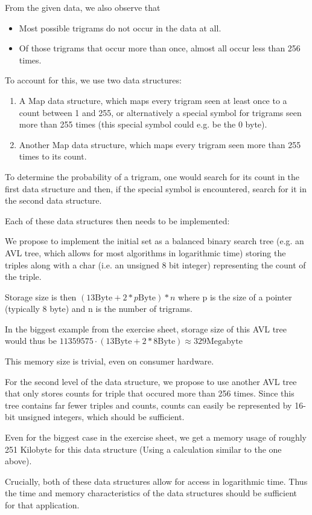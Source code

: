 \documentclass[%
   11pt,              %
   ngerman,           %
   a4paper,           %
   DIV11,             %
]{scrartcl}%
\begin{document}
From the given data, we also observe that 
\begin{itemize}
    \item Most possible trigrams do not occur in the data at all.
    \item Of those trigrams that occur more than once, almost all occur less than 256 times.
\end{itemize}

To account for this, we use two data structures:

\begin{enumerate}
    \item A Map data structure, which maps every trigram seen at least once to a count between 1 and 255, or alternatively a special symbol for trigrams seen more than 255 times (this special symbol could e.g. be the 0 byte).
    \item Another Map data structure, which maps every trigram seen more than 255 times to its count.
\end{enumerate}

To determine the probability of a trigram, one would search for its count in the first data structure and then, if the special symbol is encountered, search for it in the second data structure.

Each of these data structures then needs to be implemented:

We propose to implement the initial set as a balanced binary search tree (e.g. an AVL tree, which allows for most algorithms in logarithmic time) storing the triples along with a char (i.e. an unsigned 8 bit integer) representing the count of the triple. 

Storage size is then $(13 \text{Byte} + 2*p\text{Byte}) * n$ where p is the size of a pointer (typically 8 byte) and n is the number of trigrams. 

In the biggest example from the exercise sheet, storage size of this AVL tree would thus be 
$11359575 \cdot (13\text{Byte}+ 2*8\text{Byte}) \approx 329 \text{Megabyte}$

This memory size is trivial, even on consumer hardware.

For the second level of the data structure, we propose to use another AVL tree that only stores counts for triple that occured more than 256 times. Since this tree contains far fewer triples and counts, counts can easily be represented by 16-bit unsigned integers, which should be sufficient.

Even for the biggest case in the exercise sheet, we get a memory usage of roughly 251 Kilobyte for this data structure (Using a calculation similar to the one above).    

Crucially, both of these data structures allow for access in logarithmic time. Thus the time and memory characteristics of the data structures should be sufficient for that application.
\end{document}
